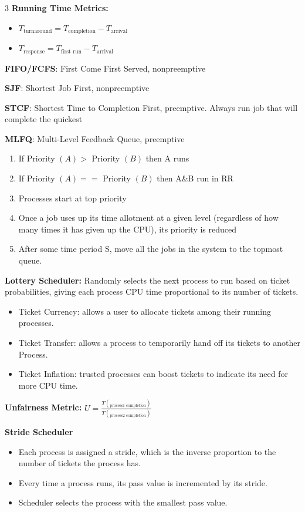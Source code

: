 \documentclass[8pt]{innovativeinnovation-cheatsheet}
\begin{document}
\begin{multicols*}{3}
\textbf{Running Time Metrics:}
\begin{itemize}
      \item \( T_{\text{turnaround}} = T_{\text{completion}} - T_{\text{arrival}}\)
      \item \( T_{\text{response}} = T_{\text{first run}} - T_{\text{arrival}}\)
\end{itemize}

\textbf{FIFO/FCFS}: First Come First Served, nonpreemptive

\textbf{SJF}: Shortest Job First, nonpreemptive

\textbf{STCF}: Shortest Time to Completion First, preemptive. Always run job that will complete the quickest

\textbf{MLFQ}: Multi-Level Feedback Queue, preemptive
\begin{enumerate}
      \item If Priority $(A)>$ Priority $(B)$ then A runs
      \item If Priority $(A)==$ Priority $(B)$ then A\&B run in RR
      \item Processes start at top priority
      \item Once a job uses up its time allotment at a given level (regardless of how many times it has given up the CPU), its priority is reduced
      \item After some time period S, move all the jobs in the system to the topmost queue.
\end{enumerate}

\textbf{Lottery Scheduler:} Randomly selects the next process to run based on ticket probabilities, giving each process CPU time proportional to its number of tickets.
\begin{itemize}
      \item Ticket Currency: allows a user to allocate tickets among their running processes.
      \item Ticket Transfer: allows a process to temporarily hand off its tickets to another Process.
      \item Ticket Inflation: trusted processes can boost tickets to indicate its need for more CPU time.
\end{itemize}

\textbf{Unfairness Metric:} \( U = \frac{T(_{\text{process1 completion}})}{T(_{\text{process2 completion}})} \)

\textbf{Stride Scheduler}
\begin{itemize}
      \item Each process is assigned a stride, which is the inverse proportion to the number of tickets the process has. 
      \item Every time a process runs, its pass value is incremented by its stride.
      \item Scheduler selects the process with the smallest pass value.
\end{itemize}


\end{multicols*}
\end{document}
